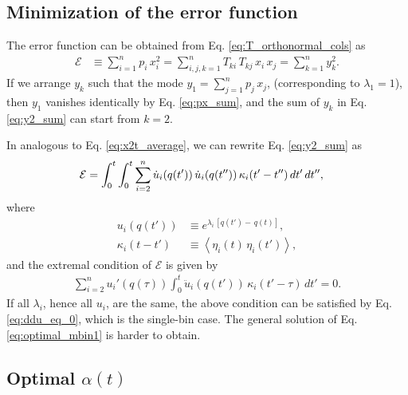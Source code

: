 \documentclass[reprint]{revtex4-1}
\begin{document}
\subsection{Minimization of the error function}



The error function can be obtained
from Eq. \eqref{eq:T_orthonormal_cols}
as
\begin{align}
  \mathcal E
  &\equiv
  \sum_{i = 1}^n p_i \, x_i^2
  =
  \sum_{i, j, k=1}^n T_{ki} \, T_{kj} \, x_i \, x_j
  =
  \sum_{k = 1}^n y_k^2.
  \label{eq:y2_sum}
\end{align}
%
If we arrange $y_k$ such that
the mode $y_1 = \sum_{j=1}^n p_j \, x_j$,
(corresponding to $\lambda_1 = 1$),
then $y_1$ vanishes identically
by Eq. \eqref{eq:px_sum},
and the sum of $y_k$ in Eq. \eqref{eq:y2_sum}
can start from $k = 2$.



In analogous to Eq. \eqref{eq:x2t_average},
we can rewrite Eq. \eqref{eq:y2_sum} as
%
\begin{align}
  \mathcal E
  &=
  \int_0^t \int_0^t
  \sum_{i = 2}^n
  \dot u_i(q(t')) \,
  \dot u_i(q(t'')) \,
  \kappa_i(t' - t'') \, dt' \, dt'',
  \notag
\end{align}
%
where
\begin{align*}
  u_i(q(t'))
  &\equiv
  e^{\lambda_i \, [q(t') - \, q(t)]},
  \\
  \kappa_i(t - t')
  &\equiv
  \left\langle \eta_i(t) \, \eta_i(t') \right\rangle,
\end{align*}
%
and the extremal condition of $\mathcal E$ is given by
%
\begin{align}
\sum_{i=2}^n
u_i'(q(\tau))
\int_0^t
\ddot u_i(q(t')) \, \kappa_i(t' - \tau) \, dt' = 0.
\label{eq:optimal_mbin1}
\end{align}
%
If all $\lambda_i$, hence all $u_i$, are the same,
the above condition can be satisfied
by Eq. \eqref{eq:ddu_eq_0},
which is the single-bin case.
%
The general solution of Eq. \eqref{eq:optimal_mbin1}
is harder to obtain.
%



\subsection{Optimal $\alpha(t)$}
\end{document}
